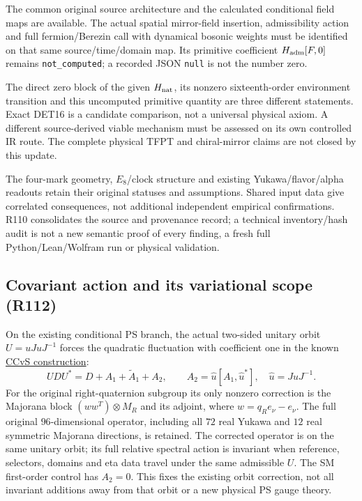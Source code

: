\begin{gapbox}
The common original source architecture and the calculated conditional
field maps are available. The actual spatial mirror-field insertion,
admissibility action and full fermion/Berezin call with dynamical
bosonic weights must be identified on that same source/time/domain
map. Its primitive coefficient $H_{\rm adm}[F,0]$ remains
\texttt{not\_computed}; a recorded JSON
\texttt{null} is not the number zero.

The direct zero block of the given $H_{\rm nat}$, its nonzero
sixteenth-order environment transition and this uncomputed primitive
quantity are three different statements. Exact DET16 is a candidate
comparison, not a universal physical axiom. A different
source-derived viable mechanism must be assessed on its own
controlled IR route. The complete physical TFPT and chiral-mirror
claims are not closed by this update.
\end{gapbox}

The four-mark geometry, $E_8$/clock structure and existing
Yukawa/flavor/alpha readouts retain their original statuses and
assumptions. Shared input data give correlated consequences, not
additional independent empirical confirmations. R110 consolidates
the source and provenance record; a technical inventory/hash audit
is not a new semantic proof of every finding, a fresh full
Python/Lean/Wolfram run or physical validation.

\subsection*{Covariant action and its variational scope (R112)}

On the existing conditional PS branch, the actual two-sided unitary
orbit $U=uJuJ^{-1}$ forces the quadratic fluctuation with coefficient
one in the known \href{https://arxiv.org/abs/1304.7583}{CCvS construction}:
\[
 UDU^*=D+A_1+\widetilde A_1+A_2,\qquad
 A_2=\widehat u[A_1,\widehat u^*],\quad
 \widehat u=JuJ^{-1}.
\]
For the original right-quaternion subgroup its only nonzero correction
is the Majorana block $(w w^T)\otimes M_R$ and its adjoint, where
$w=q_R e_\nu-e_\nu$. The full original $96$-dimensional operator,
including all $72$ real Yukawa and $12$ real symmetric Majorana
directions, is retained. The corrected operator is on the same unitary
orbit; its full relative spectral action is invariant when reference,
selectors, domains and eta data travel under the same admissible $U$.
The SM first-order control has $A_2=0$. This fixes the existing orbit
correction, not all invariant additions away from that orbit or a new
physical PS gauge theory.

